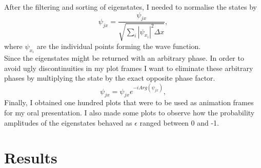 \documentclass[10pt, a4paper, singlespacing]{report}
\begin{document}
After the filtering and sorting of eigenstates, I needed to normalise the states by 
\begin{equation}
\psi_{jx} = \frac{\psi_{jx}}{\sqrt{\sum_{i} |\psi_{x_{i}}|^2 \Delta x}},
\end{equation}
where $\psi_{x_{i}}$ are the individual points forming the wave function.\\
Since the eigenstates might be returned with an arbitrary phase. In order to avoid ugly discontinuities in my plot frames I want to eliminate these arbitrary phases by multiplying the state by the exact opposite phase factor.
\begin{equation}
\psi_{jx} = \psi_{jx} e^{-iArg(\psi_{jx})},
\end{equation}
Finally, I obtained one hundred plots that were to be used as animation frames for my oral presentation. I also made some plots to observe how the probability amplitudes of the eigenstates behaved as $\epsilon$ ranged between 0 and -1.


\section{Results}
\end{document}
